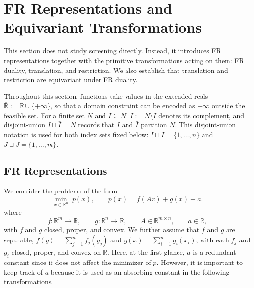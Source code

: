 \section{FR Representations and Equivariant Transformations}
\label{sec:operators}
This section does not study screening directly. Instead, it introduces FR representations together with the primitive transformations acting on them: FR duality, translation, and restriction. We also establish that translation and restriction are equivariant under FR duality.

Throughout this section, functions take values in the extended reals \(\overline{\mathbb R}:=\mathbb R\cup\{+\infty\}\), so that a domain constraint can be encoded as \(+\infty\) outside the feasible set. For a finite set \(N\) and \(I\subseteq N\), \(\bar I:=N\setminus I\) denotes its complement, and  disjoint-union \(I\sqcup\bar I=N\) records that \(I\) and \(\bar I\) partition \(N\). This disjoint-union notation is used for both index sets fixed below: \(I\sqcup\bar I=\{1,\ldots,n\}\) and \(J\sqcup\bar J=\{1,\ldots,m\}\).







\subsection{FR Representations}

We consider the problems of the form
\begin{equation}
\min_{x \in \mathbb R^n}\;
p(x), \qquad p(x) = f(Ax)+g(x)+a.
\label{eq:FR-problem}
\end{equation}
where
\begin{equation}
f:\mathbb R^m\rightarrow\overline{\mathbb R},
\qquad
g:\mathbb R^n\rightarrow\overline{\mathbb R},
\qquad
A\in\mathbb R^{m\times n},
\qquad
a\in\mathbb R,
\label{eq:cond-of-FR-representation}
\end{equation}
with \(f\) and \(g\) closed, proper, and convex.
We further assume that \(f\) and \(g\) are separable, \(f(y)=\sum_{j=1}^m f_j(y_j)\)
and \(g(x)=\sum_{i=1}^n g_i(x_i)\), with each \(f_j\) and \(g_i\) closed, proper, and convex on $\mathbb{R}$. Here, at the first glance, \(a\) is a redundant constant since it does not affect the minimizer of \(p\). However, it is important to keep track of \(a\) because it is used as an absorbing constant in the following transformations. 


